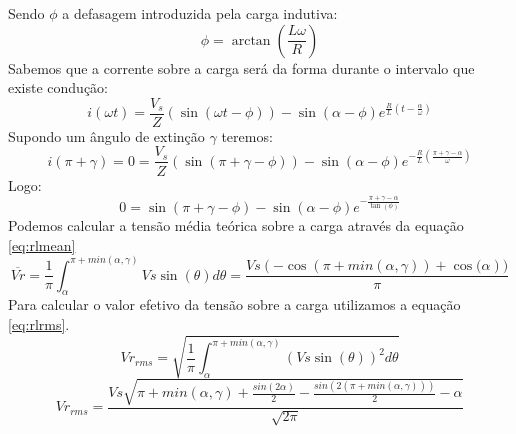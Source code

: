 \documentclass{article}
\begin{document}
Sendo $\phi$ a defasagem introduzida pela carga indutiva:
\begin{equation}
	\phi = \arctan{(\frac{L\omega}{R})}
\end{equation}
Sabemos que a corrente sobre a carga será da forma durante o intervalo que existe condução:
\begin{equation}
	i(\omega t) = \frac{V_s}{Z}(\sin(\omega t - \phi)) - \sin(\alpha - \phi)e^{\frac{R}{L}(t - \frac{\alpha}{\omega})}
\end{equation}
Supondo um ângulo de extinção $\gamma$ teremos:
\begin{equation}
i(\pi + \gamma) = 0 = \frac{V_s}{Z}(\sin(\pi + \gamma - \phi)) - \sin(\alpha - \phi)e^{-\frac{R}{L}(\frac{\pi + \gamma - \alpha}{\omega})}
\end{equation}
Logo:
\begin{equation}
 0 = \sin(\pi + \gamma - \phi) - \sin(\alpha - \phi)e^{-\frac{\pi + \gamma - \alpha}{\tan(\phi)}}
 \label{eq:gamma}
\end{equation}
Podemos calcular a tensão média teórica sobre a carga através da equação \ref{eq:rlmean}
\begin{equation}
\overline{Vr} = \frac{1}{\pi} \int_{\alpha}^{\pi + min(\alpha, \gamma)}{Vs \sin{(\theta)}d\theta} = \frac{Vs (-\cos{(\pi + min(\alpha, \gamma))} + \cos{(\alpha}))}{\pi}
\label{eq:rlmean}
\end{equation}
Para calcular o valor efetivo da tensão sobre a carga utilizamos a equação \ref{eq:rlrms}.
\begin{equation}
Vr_{rms} = \sqrt{\frac{1}{\pi} \int_{\alpha}^{\pi + min(\alpha, \gamma)}{(Vs \sin(\theta))^2 d\theta}}
\end{equation}
\begin{equation}
Vr_{rms} = \frac{Vs \sqrt{\pi + min(\alpha, \gamma) + \frac{sin(2\alpha)}{2} - \frac{sin(2(\pi + min(\alpha, \gamma)))}{2} - \alpha }}{\sqrt{2 \pi}} 
\label{eq:rlrms}
\end{equation}
\end{document}

